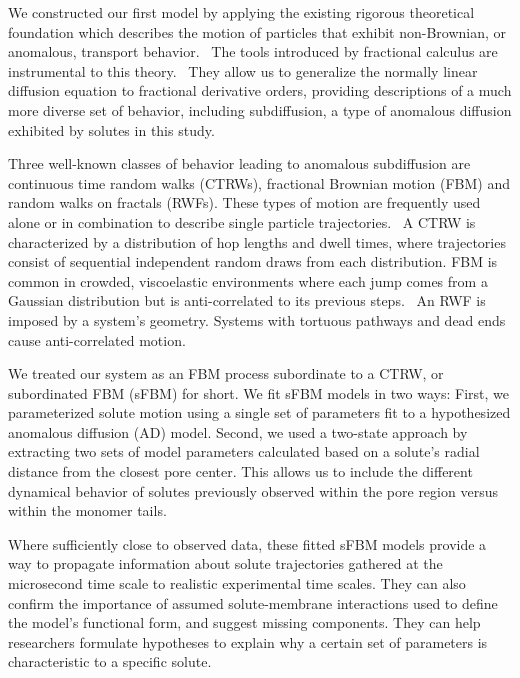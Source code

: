 \documentclass[aps,pre,preprint,groupedaddress,longbibliography]{revtex4-2}
\begin{document}
  We constructed our first model by applying the existing rigorous theoretical
  foundation which describes the motion of particles that exhibit non-Brownian,
  or anomalous, transport behavior.~\cite{metzler_random_2000,bouchaud_anomalous_1990} The tools
  introduced by fractional calculus are instrumental to this
  theory.~\cite{gorenflo_fractional_1997} They allow us to generalize the
  normally linear diffusion equation to fractional derivative orders, providing
  descriptions of a much more diverse set of behavior, including subdiffusion,
  a type of anomalous diffusion exhibited by solutes in this
  study.~\cite{klages_anomalous_2008}

  Three well-known classes of behavior leading to anomalous subdiffusion are
  continuous time random walks (CTRWs), fractional Brownian motion (FBM) and
  random walks on fractals (RWFs).\cite{meroz_toolbox_2015} These types of
  motion are frequently used alone or in combination to describe single
  particle trajectories.~\cite{morrin_three_2018,metzler_anomalous_2014} A CTRW
  is characterized by a distribution of hop lengths and dwell times, where
  trajectories consist of sequential independent random draws from each
  distribution.\cite{montroll_random_1965} FBM is common in crowded,
  viscoelastic environments where each jump comes from a Gaussian distribution
  but is anti-correlated to its previous
  steps.~\cite{mandelbrot_fractional_1968,jeon_fractional_2010,banks_anomalous_2005}
  An RWF is imposed by a system's geometry. Systems with tortuous pathways and
  dead ends cause anti-correlated
  motion.\cite{meroz_toolbox_2015,neusius_subdiffusion_2008}

  We treated our system as an FBM process subordinate to a CTRW, or
  subordinated FBM (sFBM) for short. We fit sFBM models in two ways: First, we
  parameterized solute motion using a single set of parameters fit to a
  hypothesized anomalous diffusion (AD) model. Second, we used a two-state approach
  by extracting two sets of model parameters calculated based on a solute's
  radial distance from the closest pore center. This allows us to include
  the different dynamical behavior of solutes previously observed within the
  pore region versus within the monomer tails.
 
  Where sufficiently close to observed data, these fitted sFBM models
  provide a way to propagate information about solute trajectories gathered 
  at the microsecond time scale to realistic experimental time scales. 
  They can also confirm the importance of assumed solute-membrane interactions 
  used to define the model's functional form, and
  suggest missing components. They can help researchers formulate hypotheses to
  explain why a certain set of parameters is characteristic to a specific
  solute.
  
\end{document}
